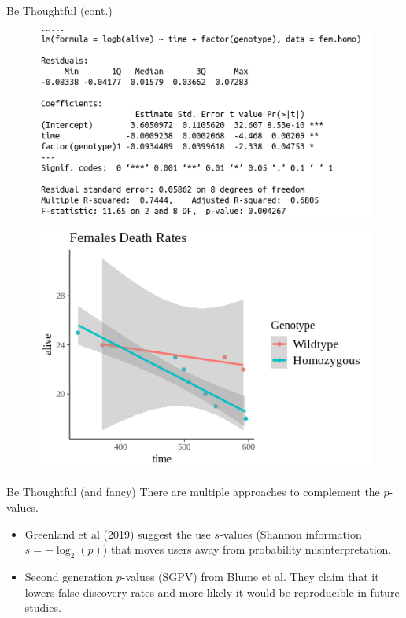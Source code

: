 \documentclass{beamer}
\begin{document}
\begin{frame}{Be Thoughtful (cont.)}
\begin{figure}[!htb]
	\centering
	\begin{minipage}{.5\textwidth}
		\centering
		\includegraphics[width=1.2\linewidth]{../../Figures/females_date_rates_stats.png}
	\end{minipage}%
	\begin{minipage}{0.5\textwidth}
		\centering
		\includegraphics[width=1.2\linewidth]{../../Figures/females_death_rates.png}
	\end{minipage}
\end{figure}

\end{frame}


\begin{frame}{Be Thoughtful (and fancy)}
There are multiple approaches to complement the $p$-values.

\begin{itemize}
	\item Greenland et al (2019) suggest the use $s$-values (Shannon information $s=-\log_2 (p)$) that moves users away from probability misinterpretation.
	\item Second generation $p$-values (SGPV) from Blume et al. They claim that it lowers false discovery rates and more likely it would be reproducible in future studies.
\end{itemize}

\end{frame}
\end{document}
